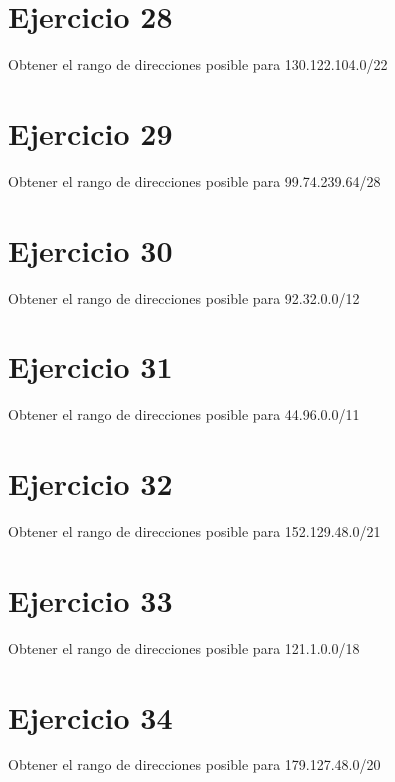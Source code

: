 \documentclass[letterpaper,10pt,spanish]{sphinxmanual}
\begin{document}
\section{Ejercicio 28}
\label{\detokenize{t2_integracion_elementos/ejercicios_subredes_ipv4/rangos_direcciones:ejercicio-28}}
\sphinxAtStartPar
Obtener el rango de direcciones posible para 130.122.104.0/22


\section{Ejercicio 29}
\label{\detokenize{t2_integracion_elementos/ejercicios_subredes_ipv4/rangos_direcciones:ejercicio-29}}
\sphinxAtStartPar
Obtener el rango de direcciones posible para 99.74.239.64/28


\section{Ejercicio 30}
\label{\detokenize{t2_integracion_elementos/ejercicios_subredes_ipv4/rangos_direcciones:ejercicio-30}}
\sphinxAtStartPar
Obtener el rango de direcciones posible para 92.32.0.0/12


\section{Ejercicio 31}
\label{\detokenize{t2_integracion_elementos/ejercicios_subredes_ipv4/rangos_direcciones:ejercicio-31}}
\sphinxAtStartPar
Obtener el rango de direcciones posible para 44.96.0.0/11


\section{Ejercicio 32}
\label{\detokenize{t2_integracion_elementos/ejercicios_subredes_ipv4/rangos_direcciones:ejercicio-32}}
\sphinxAtStartPar
Obtener el rango de direcciones posible para 152.129.48.0/21


\section{Ejercicio 33}
\label{\detokenize{t2_integracion_elementos/ejercicios_subredes_ipv4/rangos_direcciones:ejercicio-33}}
\sphinxAtStartPar
Obtener el rango de direcciones posible para 121.1.0.0/18


\section{Ejercicio 34}
\label{\detokenize{t2_integracion_elementos/ejercicios_subredes_ipv4/rangos_direcciones:ejercicio-34}}
\sphinxAtStartPar
Obtener el rango de direcciones posible para 179.127.48.0/20
\end{document}
